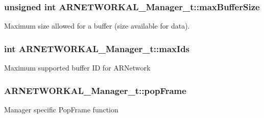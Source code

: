 \subsubsection[{\texorpdfstring{max\+Buffer\+Size}{maxBufferSize}}]{\setlength{\rightskip}{0pt plus 5cm}unsigned int A\+R\+N\+E\+T\+W\+O\+R\+K\+A\+L\+\_\+\+Manager\+\_\+t\+::max\+Buffer\+Size}\hypertarget{struct_a_r_n_e_t_w_o_r_k_a_l___manager__t_ad4b8498564736c74c3dfc47ca1286905}{}\label{struct_a_r_n_e_t_w_o_r_k_a_l___manager__t_ad4b8498564736c74c3dfc47ca1286905}
Maximum size allowed for a buffer (size available for data). 
\subsubsection[{\texorpdfstring{max\+Ids}{maxIds}}]{\setlength{\rightskip}{0pt plus 5cm}int A\+R\+N\+E\+T\+W\+O\+R\+K\+A\+L\+\_\+\+Manager\+\_\+t\+::max\+Ids}\hypertarget{struct_a_r_n_e_t_w_o_r_k_a_l___manager__t_a9401ee06c0c3afea5ec089e64ef37ede}{}\label{struct_a_r_n_e_t_w_o_r_k_a_l___manager__t_a9401ee06c0c3afea5ec089e64ef37ede}
Maximum supported buffer ID for A\+R\+Network 
\subsubsection[{\texorpdfstring{pop\+Frame}{popFrame}}]{ A\+R\+N\+E\+T\+W\+O\+R\+K\+A\+L\+\_\+\+Manager\+\_\+t\+::pop\+Frame}\hypertarget{struct_a_r_n_e_t_w_o_r_k_a_l___manager__t_a60838d4f20e0c3ddb9c1b0911fedf278}{}\label{struct_a_r_n_e_t_w_o_r_k_a_l___manager__t_a60838d4f20e0c3ddb9c1b0911fedf278}
Manager specific Pop\+Frame function 
